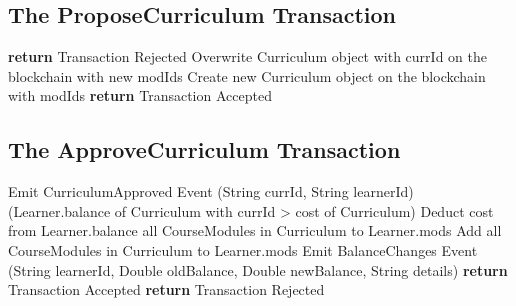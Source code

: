 \subsection{The ProposeCurriculum Transaction}

\begin{algorithm}
	\begin{algorithmic}[0]
		\State \textbf{return} Transaction Rejected
		\EndIf
		\State Overwrite Curriculum object with currId on the blockchain with new modIds
		\Else
		\State Create new Curriculum object on the blockchain with modIds
		\EndIf
		\State \textbf{return} Transaction Accepted
		\EndFunction
	\end{algorithmic}
\end{algorithm}

\clearpage
\subsection{The ApproveCurriculum Transaction}

\begin{algorithm}
	\begin{algorithmic}[0]
		Emit CurriculumApproved Event (String currId, String learnerId)
		\If (Learner.balance of Curriculum with currId > cost of Curriculum)
		\State Deduct cost from Learner.balance all CourseModules in Curriculum to Learner.mods
		\State Add all CourseModules in Curriculum to Learner.mods
		\State Emit BalanceChanges Event (String learnerId, Double oldBalance, Double newBalance, String details)
		\State \textbf{return} Transaction Accepted
		\Else
		\State \textbf{return} Transaction Rejected
		\EndIf
		\EndFunction
	\end{algorithmic}
\end{algorithm}


